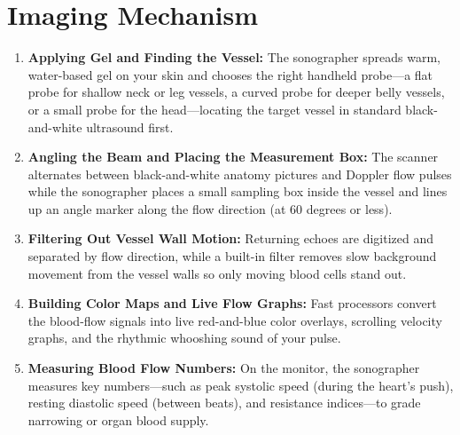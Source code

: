 \section{Imaging Mechanism}
\begin{enumerate}
\item \textbf{Applying Gel and Finding the Vessel:} The sonographer spreads warm, water-based gel on your skin and chooses the right handheld probe---a flat probe for shallow neck or leg vessels, a curved probe for deeper belly vessels, or a small probe for the head---locating the target vessel in standard black-and-white ultrasound first.
\item \textbf{Angling the Beam and Placing the Measurement Box:} The scanner alternates between black-and-white anatomy pictures and Doppler flow pulses while the sonographer places a small sampling box inside the vessel and lines up an angle marker along the flow direction (at 60 degrees or less).
\item \textbf{Filtering Out Vessel Wall Motion:} Returning echoes are digitized and separated by flow direction, while a built-in filter removes slow background movement from the vessel walls so only moving blood cells stand out.
\item \textbf{Building Color Maps and Live Flow Graphs:} Fast processors convert the blood-flow signals into live red-and-blue color overlays, scrolling velocity graphs, and the rhythmic whooshing sound of your pulse.
\item \textbf{Measuring Blood Flow Numbers:} On the monitor, the sonographer measures key numbers---such as peak systolic speed (during the heart's push), resting diastolic speed (between beats), and resistance indices---to grade narrowing or organ blood supply.
\end{enumerate}

